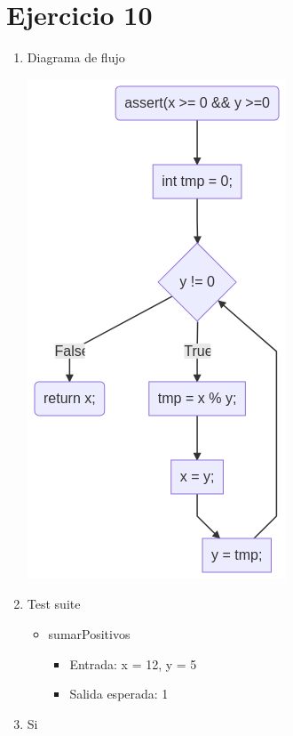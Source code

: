 \documentclass{article}
\begin{document}
\section*{Ejercicio 10}

\begin{enumerate}
    \item Diagrama de flujo
    
    \includegraphics[scale=0.65]{recursos/mcd.png}

    \item Test suite
        \begin{itemize}
            \item sumarPositivos
                \begin{itemize}
                    \item Entrada: x = 12, y = 5
                    \item Salida esperada: 1
                \end{itemize}
        \end{itemize}
    \item Si
\end{enumerate}
\end{document}
